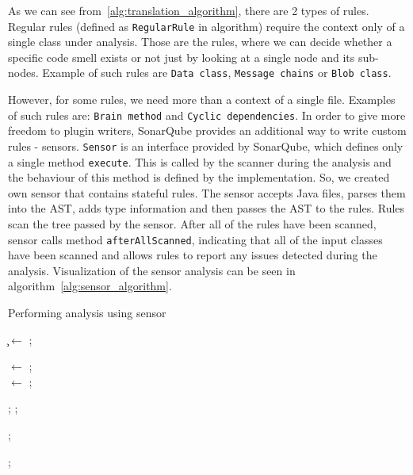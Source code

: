 As we can see from~\ref{alg:translation_algorithm}, there are 2 types of rules.
Regular rules (defined as \verb|RegularRule| in algorithm) require the context only of a single class under analysis.
Those are the rules, where we can decide whether a specific code smell exists or not just by looking at a single node
and its sub-nodes.
Example of such rules are \verb|Data class|, \verb|Message chains| or \verb|Blob class|.

However, for some rules, we need more than a context of a single file.
Examples of such rules are: \verb|Brain method| and \verb|Cyclic dependencies|.
In order to give more freedom to plugin writers, SonarQube provides an additional way to write custom rules - sensors.
\verb|Sensor| is an interface provided by SonarQube, which defines only a single method \verb|execute|.
This is called by the scanner during the analysis and the behaviour of this method is defined by the implementation.
So, we created own sensor that contains stateful rules.
The sensor accepts Java files, parses them into the AST, adds type information and then passes the AST to the rules.
Rules scan the tree passed by the sensor.
After all of the rules have been scanned, sensor calls method \verb|afterAllScanned|, indicating that all of the
input classes have been scanned and allows rules to report any issues detected during the analysis.
Visualization of the sensor analysis can be seen in algorithm~\ref{alg:sensor_algorithm}.

\begin{algorithm} [!htb]
    \caption{Performing analysis using sensor}
    \label{alg:sensor_algorithm}
    \BlankLine

    \c$\leftarrow$ \CreateClassPath; \\

     {
        \AST$\leftarrow$ \ParseJavaFile { \j }; \\
        \AstWithSymbolicModel$\leftarrow$ \UpdateSymbolicModel{\j, \c};

         {
            \Scan{\r, \AstWithSymbolicModel};
        };
    }

     {
        \AfterAllScanned{};
    }

    \UploadResults{};
\end{algorithm}


